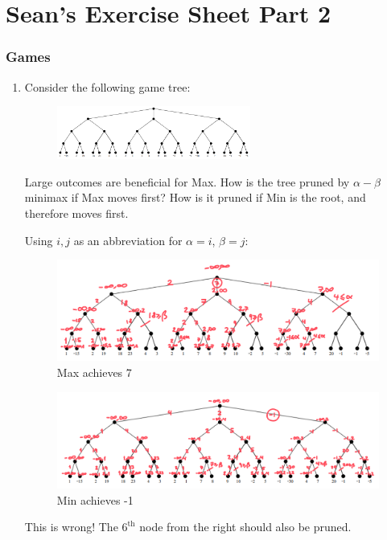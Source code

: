 \documentclass[10pt,\jkfside,a4paper]{article}
\begin{document}
\part{Sean's Exercise Sheet Part 2}

\setcounter{section}{0}

\section{Games}

\begin{enumerate}

\item Consider the following game tree:

\begin{figure}[H]
\centering
\includegraphics[width=0.6\textwidth]{minmaxtree}
\end{figure}

Large outcomes are beneficial for Max. How is the tree pruned by $\alpha -
\beta$ minimax if Max moves first? How is it pruned if Min is the root, and
therefore moves first.

Using $i, j$ as an abbreviation for $\alpha = i$, $\beta = j$:

\begin{figure}[H]
\centering
\includegraphics[width=\textwidth]{maxtree}
\caption{Max achieves 7}
\end{figure}

\begin{figure}[H]
\centering
\includegraphics[width=\textwidth]{mintree}
\caption{Min achieves -1}
\end{figure}
{\color{blue}
This is wrong! The $6^{\text{th}}$ node from the right should also be pruned.
}


\end{enumerate}
\end{document}
